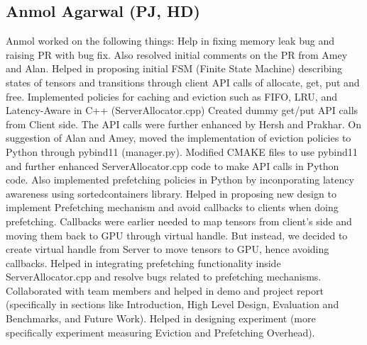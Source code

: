 \documentclass{article}
\begin{document}
\subsection{Anmol Agarwal (PJ, HD)}
Anmol worked on the following things:
Help in fixing memory leak bug and raising PR with bug fix. Also resolved initial comments on the PR from Amey and Alan.
Helped in proposing initial FSM (Finite State Machine) describing states of tensors and transitions through client API calls
of allocate, get, put and free.
Implemented policies for caching and eviction such as FIFO, LRU, and Latency-Aware in C++ (ServerAllocator.cpp)
Created dummy get/put API calls from Client side. The API calls were further enhanced by Hersh and Prakhar.
On suggestion of Alan and Amey, moved the implementation of eviction policies to Python through pybind11 (manager.py).
Modified CMAKE files to use pybind11 and further enhanced ServerAllocator.cpp code to make API calls in Python code.
Also implemented prefetching policies in Python by inconporating latency awareness using sortedcontainers library.
Helped in proposing new design to implement Prefetching mechanism and avoid callbacks to clients when doing prefetching.
Callbacks were earlier needed to map tensors from client's side and moving them back to GPU through virtual handle. But instead,
we decided to create virtual handle from Server to move tensors to GPU, hence avoiding callbacks.
Helped in integrating prefetching functionality inside ServerAllocator.cpp and resolve bugs related to prefetching mechanisms.
Collaborated with team members and helped in demo and project report (specifically in sections like Introduction, High Level Design,
Evaluation and Benchmarks, and Future Work).
Helped in designing experiment (more specifically experiment measuring Eviction and Prefetching Overhead).

\printbibliography

% 



\end{document}
